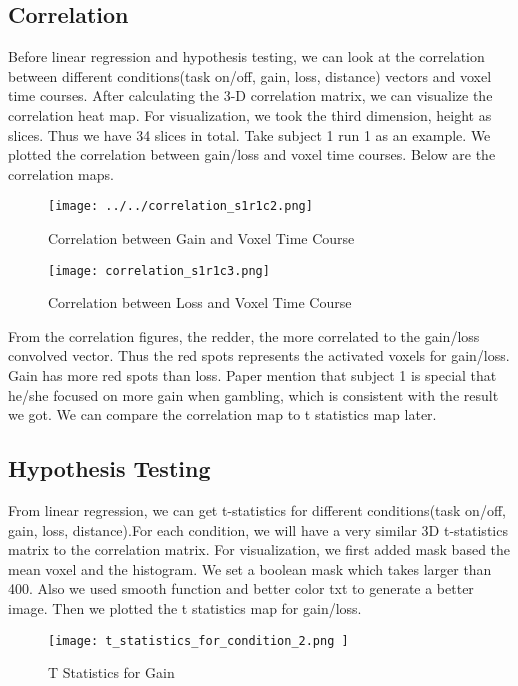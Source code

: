 \subsection{Correlation}
\noindent
Before linear regression and hypothesis testing, we can look at the correlation between different conditions(task on/off, gain, loss, distance) vectors and voxel time courses. After calculating the 3-D correlation matrix, we can visualize the correlation heat map.  For visualization, we took the third dimension, height as slices. Thus we have 34 slices in total. Take subject 1  run 1 as an example.
We plotted the correlation between gain/loss and voxel time courses. Below are the correlation maps.

        

\begin{figure}[H]
    \centering
        \texttt{[image: ../../correlation\_s1r1c2.png]}
    \caption{Correlation between Gain and Voxel Time Course}
\end{figure}


\begin{figure}[H]
    \centering
        \texttt{[image: correlation\_s1r1c3.png]}
    \caption{Correlation between Loss and Voxel Time Course}
\end{figure}
\noindent
From the correlation figures, the redder, the more correlated to the gain/loss convolved vector. Thus the red spots represents the activated voxels for gain/loss. Gain has more red spots than loss. Paper mention that subject 1 is special that he/she focused on more gain when gambling, which is consistent with the result we got. We can compare the correlation map to t statistics map later.


\subsection{Hypothesis Testing}
From linear regression, we can get t-statistics for different conditions(task on/off, gain, loss, distance).For each condition, we will have a very similar 3D t-statistics matrix to the correlation matrix. For visualization, we first added mask based the mean voxel and the histogram. We set a boolean mask which takes larger than 400. Also we used smooth function and better color txt to generate a better image. Then we plotted the t statistics map for gain/loss.


\begin{figure}[H]
    \centering
        \texttt{[image: t\_statistics\_for\_condition\_2.png	]}
    \caption{T Statistics for Gain}
\end{figure}


